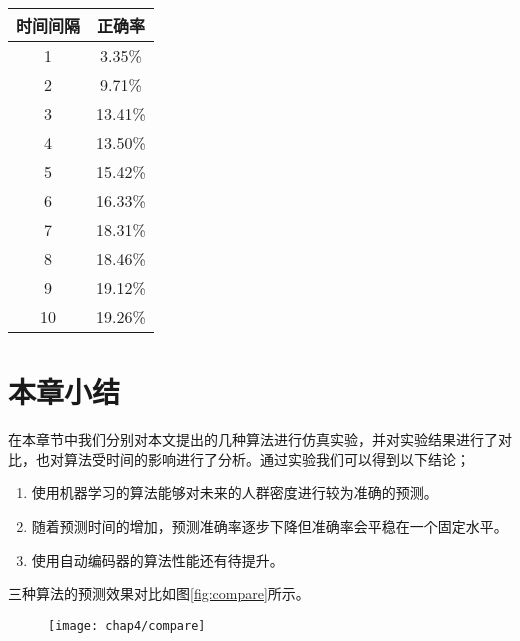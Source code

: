 \begin{table}[!hpb]
    \centering
    \begin{tabular}{@{}cc@{}} \toprule
        时间间隔 & 正确率 \\ \midrule
        1 &	3.35\% \\
        2 &	9.71\% \\
        3 & 13.41\% \\
        4 &	13.50\% \\
        5 &	15.42\% \\
        6 &	16.33\% \\
        7 &	18.31\% \\
        8 & 18.46\% \\
        9 &	19.12\% \\
        10 & 19.26\% \\
        \bottomrule
    \end{tabular}
\end{table}

\section{本章小结}

在本章节中我们分别对本文提出的几种算法进行仿真实验，并对实验结果进行了对比，也对算法受时间的影响进行了分析。通过实验我们可以得到以下结论；
\begin{enumerate}
    \item 使用机器学习的算法能够对未来的人群密度进行较为准确的预测。
    \item 随着预测时间的增加，预测准确率逐步下降但准确率会平稳在一个固定水平。
    \item 使用自动编码器的算法性能还有待提升。
\end{enumerate}

三种算法的预测效果对比如图\ref{fig:compare}所示。

\begin{figure}[!htp]
    \centering
    \texttt{[image: chap4/compare]}
\end{figure} 